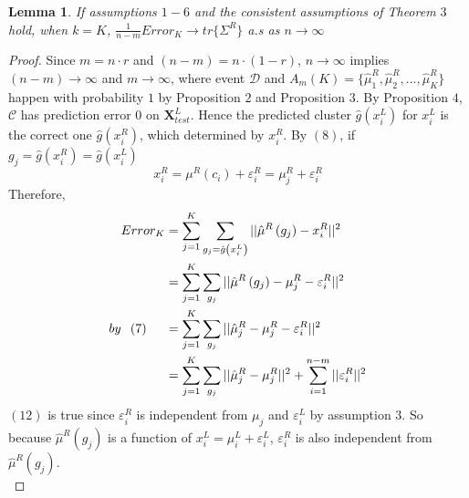 \documentclass[11pt]{article}
\newtheorem{lemma}{Lemma}
\begin{document}
\begin{lemma}
	If assumptions $1-6$ and the consistent assumptions of Theorem $3$ hold, when $k=K$, $\frac{1}{n-m} Error_K \to tr\{\Sigma^R\}$ a.s as $n \to \infty$
\end{lemma}
\begin{proof}
Since $m= n \cdot r$ and $(n-m) = n \cdot (1-r)$, $n \to \infty$ implies $(n-m) \to \infty$ and $m \to \infty$, where event $\mathcal{D}$ and $A_m(K) = \{\hat{\mu}^R_1,\hat{\mu}^R_2,...,\hat{\mu}^R_K \}$ happen with probability $1$ by Proposition $2$ and Proposition $3$. By Proposition $4$, $\mathcal{C}$ has prediction error $0$ on $\mathbf{X}^L_{test}$. Hence the predicted cluster $\hat{g} \left(x^L_i\right)$ for $x^L_i$ is the correct one $\hat{g} \left(x^R_i\right)$, which determined by $x^R_i$. By $(8)$, if $g_j = \hat{g} \left(x^R_i\right) = \hat{g} \left(x^L_i\right)$
\[x^R_i = \mu^R \left(c_i\right) + \varepsilon^R_i = \mu^R_{j} + \varepsilon^R_i\] 
\noindent
Therefore,
\begin{align} \nonumber
    Error_K &= \sum^K_{j=1} \sum_{g_j = \hat{g} \left(x^L_i\right)} ||\hat{\mu}^R \left(g_j\right) - x^R_i||^2   \\ \nonumber
     & = \sum^K_{j=1} \sum_{g_j} ||\hat{\mu}^R \left(g_j\right) -\mu^R_{j} - \varepsilon^R_i||^2 \\ \nonumber 
by \hspace{0.1in} (7) \hspace{0.2in}   & = \sum^K_{j=1} \sum_{g_j} ||\hat{\mu}^R_{j} -\mu^R_{j} - \varepsilon^R_i||^2 \\ 
    &= \sum^K_{j=1} \sum_{g_j}  ||\hat{\mu}^R_{j} -\mu^R_{j}||^2 + \sum^{n-m}_{i=1}||\varepsilon^R_i||^2
\end{align}
$(12)$ is true since $\varepsilon^R_i$ is independent from $\mu_j$ and $\varepsilon^L_i$ by assumption $3$. So because $\hat{\mu}^R \left(g_j\right)$ is a function of $x^L_i = \mu^L_i + \varepsilon^L_i$, $\varepsilon^R_i$ is also independent from $\hat{\mu}^R \left(g_j\right)$. \\


\end{proof}
\end{document}
